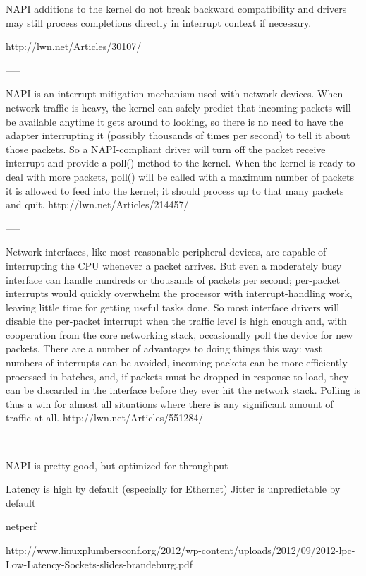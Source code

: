 NAPI additions to the kernel do not break backward compatibility and drivers may still process completions directly in interrupt context if necessary.

http://lwn.net/Articles/30107/

-----


NAPI is an interrupt mitigation mechanism used with network devices. When network traffic is heavy, the kernel can safely predict that incoming packets will be available anytime it gets around to looking, so there is no need to have the adapter interrupting it (possibly thousands of times per second) to tell it about those packets. So a NAPI-compliant driver will turn off the packet receive interrupt and provide a poll() method to the kernel. When the kernel is ready to deal with more packets, poll() will be called with a maximum number of packets it is allowed to feed into the kernel; it should process up to that many packets and quit.
http://lwn.net/Articles/214457/

-----

Network interfaces, like most reasonable peripheral devices, are capable of interrupting the CPU whenever a packet arrives. But even a moderately busy interface can handle hundreds or thousands of packets per second; per-packet interrupts would quickly overwhelm the processor with interrupt-handling work, leaving little time for getting useful tasks done. So most interface drivers will disable the per-packet interrupt when the traffic level is high enough and, with cooperation from the core networking stack, occasionally poll the device for new packets. There are a number of advantages to doing things this way: vast numbers of interrupts can be avoided, incoming packets can be more efficiently processed in batches, and, if packets must be dropped in response to load, they can be discarded in the interface before they ever hit the network stack. Polling is thus a win for almost all situations where there is any significant amount of traffic at all. 
http://lwn.net/Articles/551284/

---

NAPI is pretty good, but optimized for throughput

Latency is high by default (especially for Ethernet)
Jitter is unpredictable by default

netperf

http://www.linuxplumbersconf.org/2012/wp-content/uploads/2012/09/2012-lpc-Low-Latency-Sockets-slides-brandeburg.pdf
